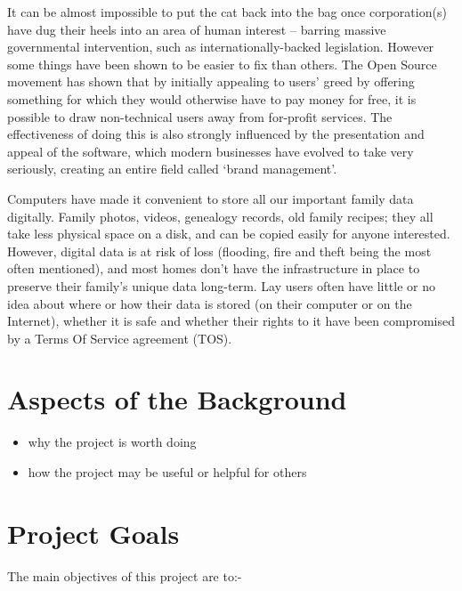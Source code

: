 \documentclass[12pt,a4paper,]{adreport}
\begin{document}
It can be almost impossible to put the cat back into the bag once
corporation(s) have dug their heels into an area of human interest --
barring massive governmental intervention, such as
internationally-backed legislation. However some things have been shown
to be easier to fix than others. The Open Source movement has shown that
by initially appealing to users' greed by offering something for which
they would otherwise have to pay money for free, it is possible to draw
non-technical users away from for-profit services. The effectiveness of
doing this is also strongly influenced by the presentation and appeal of
the software, which modern businesses have evolved to take very
seriously, creating an entire field called `brand management'.

Computers have made it convenient to store all our important family data
digitally. Family photos, videos, genealogy records, old family recipes;
they all take less physical space on a disk, and can be copied easily
for anyone interested. However, digital data is at risk of loss
(flooding, fire and theft being the most often mentioned), and most
homes don't have the infrastructure in place to preserve their family's
unique data long-term. Lay users often have little or no idea about
where or how their data is stored (on their computer or on the
Internet), whether it is safe and whether their rights to it have been
compromised by a Terms Of Service agreement (TOS).

\section{Aspects of the Background}\label{aspects-of-the-background}

\begin{itemize}
\itemsep1pt\parskip0pt
\item
  why the project is worth doing
\item
  how the project may be useful or helpful for others
\end{itemize}

\section{Project Goals}\label{project-goals}

The main objectives of this project are to:-
\end{document}
